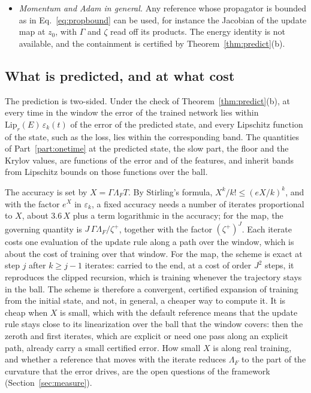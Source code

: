 \documentclass[11pt]{article}
\theoremstyle{definition}
\theoremstyle{remark}
\begin{document}
\begin{itemize}
The blocks are not normal, so $\Gamma > 1$ in general, and $\Gamma$ grows as $\zeta$ approaches the largest spectral radius of the blocks; with varying step sizes, $\zeta$ must bound the products of the blocks, not only their spectral radii.
\item \emph{Momentum and Adam in general.} Any reference whose propagator is bounded as in Eq.~\eqref{eq:propbound} can be used, for instance the Jacobian of the update map at $z_0$, with $\Gamma$ and $\zeta$ read off its products.
The energy identity is not available, and the containment is certified by Theorem~\ref{thm:predict}(b).
\end{itemize}

\subsection{What is predicted, and at what cost}

The prediction is two-sided.
Under the check of Theorem~\ref{thm:predict}(b), at every time in the window the error of the trained network lies within $\mathrm{Lip}_r(E)\,\varepsilon_k(t)$ of the error of the predicted state, and every Lipschitz function of the state, such as the loss, lies within the corresponding band.
The quantities of Part~\ref{part:onetime} at the predicted state, the slow part, the floor and the Krylov values, are functions of the error and of the features, and inherit bands from Lipschitz bounds on those functions over the ball.

The accuracy is set by $X = \Gamma\Lambda_F T$.
By Stirling's formula, $X^k/k!\le(eX/k)^k$, and with the factor $e^X$ in $\varepsilon_k$, a fixed accuracy needs a number of iterates proportional to $X$, about $3.6\,X$ plus a term logarithmic in the accuracy; for the map, the governing quantity is $J\,\Gamma\Lambda_F/\zeta^+$, together with the factor $(\zeta^+)^J$.
Each iterate costs one evaluation of the update rule along a path over the window, which is about the cost of training over that window.
For the map, the scheme is exact at step $j$ after $k\ge j - 1$ iterates: carried to the end, at a cost of order $J^2$ steps, it reproduces the clipped recursion, which is training whenever the trajectory stays in the ball.
The scheme is therefore a convergent, certified expansion of training from the initial state, and not, in general, a cheaper way to compute it.
It is cheap when $X$ is small, which with the default reference means that the update rule stays close to its linearization over the ball that the window covers: then the zeroth and first iterates, which are explicit or need one pass along an explicit path, already carry a small certified error.
How small $X$ is along real training, and whether a reference that moves with the iterate reduces $\Lambda_F$ to the part of the curvature that the error drives, are the open questions of the framework (Section~\ref{sec:measure}).
\end{document}
